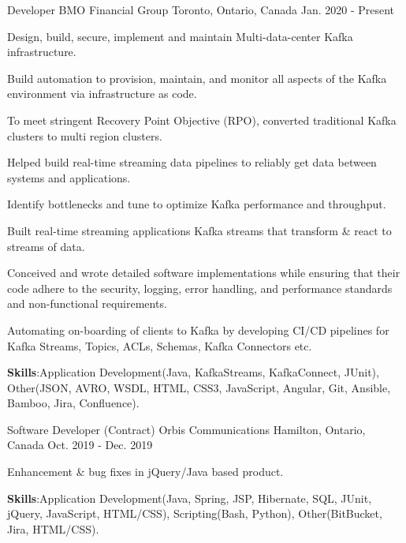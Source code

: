 

\begin{cventries}

  \cventry
    {Developer} %
    {BMO Financial Group} %
    {Toronto, Ontario, Canada} %
    {Jan. 2020 - Present} %
    {
      \begin{cvitems} %
        \item {Design, build, secure, implement and maintain Multi-data-center Kafka infrastructure.}
        \item {Build automation to provision, maintain, and monitor all aspects of the Kafka environment via infrastructure as code.}
        \item To meet stringent Recovery Point Objective (RPO), converted traditional Kafka clusters to multi region clusters. 
        \item {Helped build real-time streaming data pipelines to reliably get data between systems and applications.}
        \item {Identify bottlenecks and tune to optimize Kafka performance and throughput.}
        \item {Built real-time streaming applications Kafka streams that transform \& react to streams of data.}
        \item {Conceived and wrote detailed software implementations while ensuring that their code adhere to the security, logging, error handling, and performance standards and non-functional requirements.}
        \item {Automating on-boarding of clients to Kafka by developing CI/CD pipelines for Kafka Streams, Topics, ACLs, Schemas, Kafka Connectors etc.}
        \item {\textbf{Skills}:Application Development(Java, KafkaStreams, KafkaConnect, JUnit), Other(JSON, AVRO, WSDL, HTML, CSS3, JavaScript, Angular, Git, Ansible, Bamboo, Jira, Confluence).}
      \end{cvitems}
    }
  \cventry
    {Software Developer (Contract)} %
    {Orbis Communications} %
    {Hamilton, Ontario, Canada} %
    {Oct. 2019 - Dec. 2019} %
    {
      \begin{cvitems} %
        \item {Enhancement \& bug fixes in jQuery/Java based product.}
        \item {\textbf{Skills}:Application Development(Java, Spring, JSP, Hibernate, SQL, JUnit, jQuery, JavaScript, HTML/CSS), Scripting(Bash, Python), Other(BitBucket, Jira, HTML/CSS).}
      \end{cvitems}
    }


\end{cventries}
